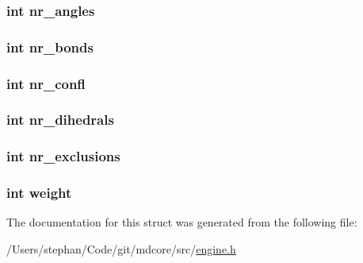 \hypertarget{structengine__set_a03b0ba344cd1442d3d3975774eeea3e9}{
\subsubsection[{nr\-\_\-angles}]{\setlength{\rightskip}{0pt plus 5cm}int nr\-\_\-angles}}\label{structengine__set_a03b0ba344cd1442d3d3975774eeea3e9}
\hypertarget{structengine__set_ad29e940869fdac422337511d82a22ae6}{
\subsubsection[{nr\-\_\-bonds}]{\setlength{\rightskip}{0pt plus 5cm}int nr\-\_\-bonds}}\label{structengine__set_ad29e940869fdac422337511d82a22ae6}
\hypertarget{structengine__set_ae8551c4c5c4f78983b2bcd01d5d6f6f9}{
\subsubsection[{nr\-\_\-confl}]{\setlength{\rightskip}{0pt plus 5cm}int nr\-\_\-confl}}\label{structengine__set_ae8551c4c5c4f78983b2bcd01d5d6f6f9}
\hypertarget{structengine__set_a3ec4bdb694eae0871b24da3bc151294c}{
\subsubsection[{nr\-\_\-dihedrals}]{\setlength{\rightskip}{0pt plus 5cm}int nr\-\_\-dihedrals}}\label{structengine__set_a3ec4bdb694eae0871b24da3bc151294c}
\hypertarget{structengine__set_a56befbaa94d303065a80da7bec85acea}{
\subsubsection[{nr\-\_\-exclusions}]{\setlength{\rightskip}{0pt plus 5cm}int nr\-\_\-exclusions}}\label{structengine__set_a56befbaa94d303065a80da7bec85acea}
\hypertarget{structengine__set_aa01147b1f07072d246c76dc85d69df7c}{
\subsubsection[{weight}]{\setlength{\rightskip}{0pt plus 5cm}int weight}}\label{structengine__set_aa01147b1f07072d246c76dc85d69df7c}


The documentation for this struct was generated from the following file\-:\begin{DoxyCompactItemize}
\item 
/\-Users/stephan/\-Code/git/mdcore/src/\hyperlink{engine_8h}{engine.\-h}\end{DoxyCompactItemize}
